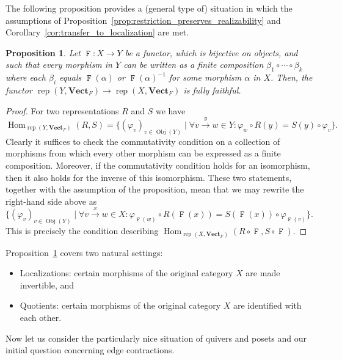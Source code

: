 \documentclass[a4paper]{amsart}
\theoremstyle{plain}
\newtheorem{proposition}[theorem]{Proposition}
\theoremstyle{definition}
\theoremstyle{remark}
\newcommand{\funct}[1]{\operatorname{\mathtt{#1}}}
\DeclareMathOperator{\Hom}{Hom}
\newcommand{\VectF}{\mathbf{Vect}_F}
\DeclareMathOperator{\rep}{rep}
\begin{document}
The following proposition provides a (general type of) situation in which the assumptions of Proposition~\ref{prop:restriction_preserves_realizability} and Corollary~\ref{cor:transfer_to_localization} are met.

\begin{proposition} \label{prop:induces_fully_faithful_restriction}
Let \( \funct{F} \colon X \to Y \) be a functor, which is bijective on objects, and such that every morphism in $Y$ can be written as a finite composition $\beta_1\circ \cdots \circ \beta_k$ where each $\beta_i$ equals $\funct{F}(\alpha)$ or $\funct{F}(\alpha)^{-1}$ for some morphism $\alpha$ in $X$.  Then, the functor \( \rep(Y, \VectF) \to \rep(X, \VectF) \) is fully faithful.
\end{proposition}

\begin{proof}
For two representations \( R \) and \( S \) we have
\[ \Hom_{\rep(Y, \VectF)}(R, S) = \{ (\varphi_v)_{v \in \operatorname{Obj}(Y)} \mid \forall v \overset{y}{\to} w \in Y \colon \varphi_w \circ R(y) = S(y) \circ \varphi_v \}. \]
Clearly it suffices to check the commutativity condition on a collection of morphisms from which every other morphism can be expressed as a finite composition.  Moreover, if the commutativity condition holds for an isomorphism, then it also holds for the inverse of this isomorphism. These two statements, together with the assumption of the proposition, mean that we may rewrite the right-hand side above as
\[\{ (\varphi_v)_{v \in \operatorname{Obj}(Y)} \mid \forall v \overset{x}{\to} w \in X \colon \varphi_{\funct{F}(w)} \circ R(\funct{F}(x)) = S(\funct{F}(x)) \circ \varphi_{\funct{F}(v)} \}. \]
This is precisely the condition describing \( \Hom_{\rep(X, \VectF)}(R \circ \funct{F}, S \circ \funct{F}) \).
\end{proof}

Proposition~\ref{prop:induces_fully_faithful_restriction} covers two natural settings:
\begin{itemize}
\item Localizations: certain morphisms of the original category \( X \) are made invertible, and
\item Quotients: certain morphisms of the original category \( X \) are identified with each other. 
\end{itemize}

Now let us consider the particularly nice situation of quivers and posets and our initial question concerning edge contractions.
\end{document}
